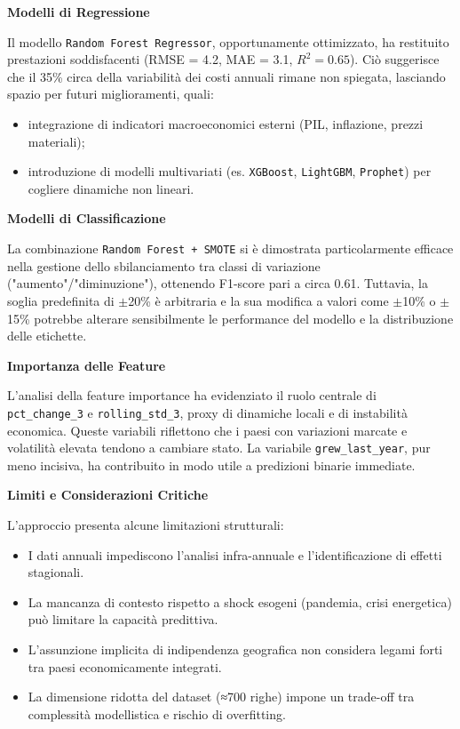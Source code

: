 \documentclass[conference]{IEEEtran}
\begin{document}
\begin{itemize}
{\noindent\textbf{Modelli di Regressione}

Il modello \texttt{Random Forest Regressor}, opportunamente ottimizzato, ha restituito prestazioni soddisfacenti (RMSE = 4.2, MAE = 3.1, $R^2 = 0.65$). Ciò suggerisce che il 35\% circa della variabilità dei costi annuali rimane non spiegata, lasciando spazio per futuri miglioramenti, quali:

\begin{itemize} \item integrazione di indicatori macroeconomici esterni (PIL, inflazione, prezzi materiali); \item introduzione di modelli multivariati (es. \texttt{XGBoost}, \texttt{LightGBM}, \texttt{Prophet}) per cogliere dinamiche non lineari. \end{itemize}

\noindent\textbf{Modelli di Classificazione}

La combinazione \texttt{Random Forest + SMOTE} si è dimostrata particolarmente efficace nella gestione dello sbilanciamento tra classi di variazione ("aumento"/"diminuzione"), ottenendo F1-score pari a circa 0.61. Tuttavia, la soglia predefinita di $\pm$20\% è arbitraria e la sua modifica a valori come $\pm$10\% o $\pm$15\% potrebbe alterare sensibilmente le performance del modello e la distribuzione delle etichette.

\noindent\textbf{Importanza delle Feature}

L’analisi della feature importance ha evidenziato il ruolo centrale di \texttt{pct\_change\_3} e \texttt{rolling\_std\_3}, proxy di dinamiche locali e di instabilità economica. Queste variabili riflettono che i paesi con variazioni marcate e volatilità elevata tendono a cambiare stato. La variabile \texttt{grew\_last\_year}, pur meno incisiva, ha contribuito in modo utile a predizioni binarie immediate.

\noindent\textbf{Limiti e Considerazioni Critiche}

L’approccio presenta alcune limitazioni strutturali: \begin{itemize} \item I dati annuali impediscono l’analisi infra-annuale e l’identificazione di effetti stagionali. \item La mancanza di contesto rispetto a shock esogeni (pandemia, crisi energetica) può limitare la capacità predittiva. \item L’assunzione implicita di indipendenza geografica non considera legami forti tra paesi economicamente integrati. \item La dimensione ridotta del dataset (≈700 righe) impone un trade-off tra complessità modellistica e rischio di overfitting. \end{itemize}


}
\end{itemize}
\end{document}
